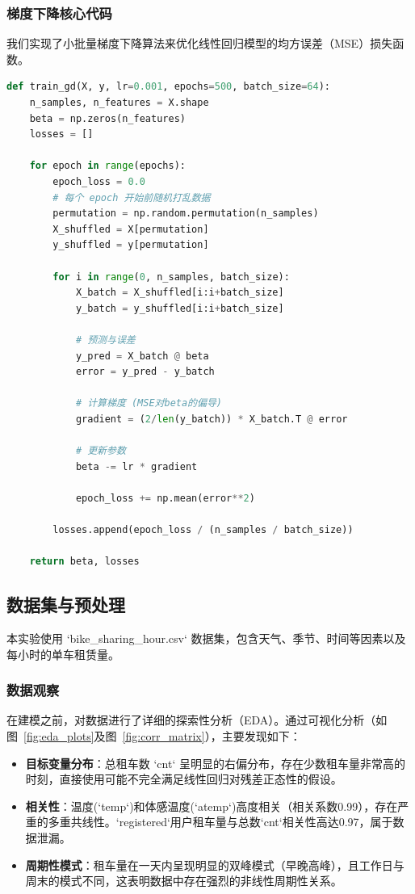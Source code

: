 \documentclass[UTF8,a4paper,10pt]{ctexart}
\begin{document}
\subsubsection{梯度下降核心代码}
我们实现了小批量梯度下降算法来优化线性回归模型的均方误差（MSE）损失函数。
\begin{lstlisting}[language=Python, caption={小批量梯度下降算法实现}]
def train_gd(X, y, lr=0.001, epochs=500, batch_size=64):
    n_samples, n_features = X.shape
    beta = np.zeros(n_features)
    losses = []

    for epoch in range(epochs):
        epoch_loss = 0.0
        # 每个 epoch 开始前随机打乱数据
        permutation = np.random.permutation(n_samples)
        X_shuffled = X[permutation]
        y_shuffled = y[permutation]

        for i in range(0, n_samples, batch_size):
            X_batch = X_shuffled[i:i+batch_size]
            y_batch = y_shuffled[i:i+batch_size]
            
            # 预测与误差
            y_pred = X_batch @ beta
            error = y_pred - y_batch
            
            # 计算梯度 (MSE对beta的偏导)
            gradient = (2/len(y_batch)) * X_batch.T @ error
            
            # 更新参数
            beta -= lr * gradient
            
            epoch_loss += np.mean(error**2)
        
        losses.append(epoch_loss / (n_samples / batch_size))
        
    return beta, losses
\end{lstlisting}

\subsection{数据集与预处理}
本实验使用 `bike\_sharing\_hour.csv` 数据集，包含天气、季节、时间等因素以及每小时的单车租赁量。

\subsubsection{数据观察}
在建模之前，对数据进行了详细的探索性分析（EDA）。通过可视化分析（如图~\ref{fig:eda_plots}及图~\ref{fig:corr_matrix}），主要发现如下：
\begin{itemize}
    \item \textbf{目标变量分布}：总租车数 `cnt` 呈明显的右偏分布，存在少数租车量非常高的时刻，直接使用可能不完全满足线性回归对残差正态性的假设。
    \item \textbf{相关性}：温度(`temp`)和体感温度(`atemp`)高度相关（相关系数0.99），存在严重的多重共线性。`registered`用户租车量与总数`cnt`相关性高达0.97，属于数据泄漏。
    \item \textbf{周期性模式}：租车量在一天内呈现明显的双峰模式（早晚高峰），且工作日与周末的模式不同，这表明数据中存在强烈的非线性周期性关系。
\end{itemize}
\end{document}

